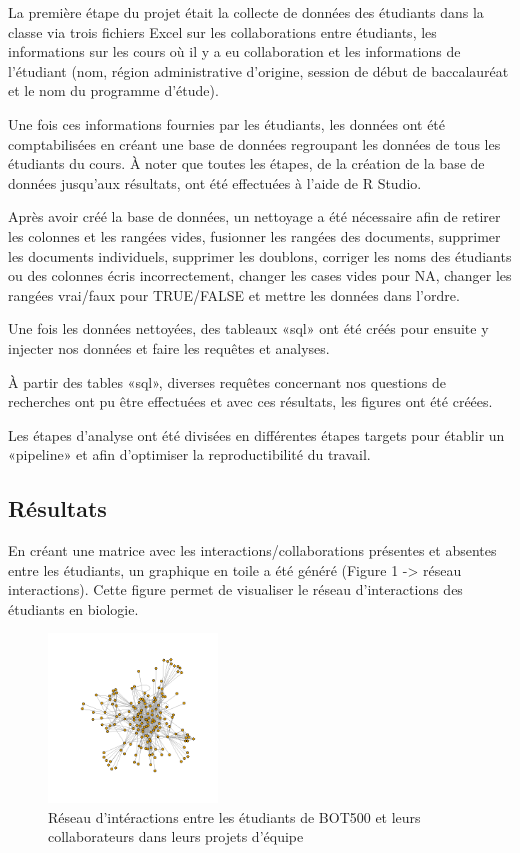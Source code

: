 \documentclass[9pt,twocolumn,twoside,]{pnas-new}
\begin{document}
La première étape du projet était la collecte de données des étudiants
dans la classe via trois fichiers Excel sur les collaborations entre
étudiants, les informations sur les cours où il y a eu collaboration et
les informations de l'étudiant (nom, région administrative d'origine,
session de début de baccalauréat et le nom du programme d'étude).

Une fois ces informations fournies par les étudiants, les données ont
été comptabilisées en créant une base de données regroupant les données
de tous les étudiants du cours. À noter que toutes les étapes, de la
création de la base de données jusqu'aux résultats, ont été effectuées à
l'aide de R Studio.

Après avoir créé la base de données, un nettoyage a été nécessaire afin
de retirer les colonnes et les rangées vides, fusionner les rangées des
documents, supprimer les documents individuels, supprimer les doublons,
corriger les noms des étudiants ou des colonnes écris incorrectement,
changer les cases vides pour NA, changer les rangées vrai/faux pour
TRUE/FALSE et mettre les données dans l'ordre.

Une fois les données nettoyées, des tableaux «sql» ont été créés pour
ensuite y injecter nos données et faire les requêtes et analyses.

À partir des tables «sql», diverses requêtes concernant nos questions de
recherches ont pu être effectuées et avec ces résultats, les figures ont
été créées.

Les étapes d'analyse ont été divisées en différentes étapes targets pour
établir un «pipeline» et afin d'optimiser la reproductibilité du
travail.

\hypertarget{ruxe9sultats}{%
\subsection{Résultats}\label{ruxe9sultats}}

En créant une matrice avec les interactions/collaborations présentes et
absentes entre les étudiants, un graphique en toile a été généré (Figure
1 -\textgreater{} réseau interactions). Cette figure permet de
visualiser le réseau d'interactions des étudiants en biologie.

\begin{figure}
\centering
\includegraphics[width=0.4\textwidth,height=0.3\textheight]{"../interactions.png"}
\caption{Réseau d'intéractions entre les étudiants de BOT500 et leurs
collaborateurs dans leurs projets d'équipe}
\end{figure}
\end{document}
